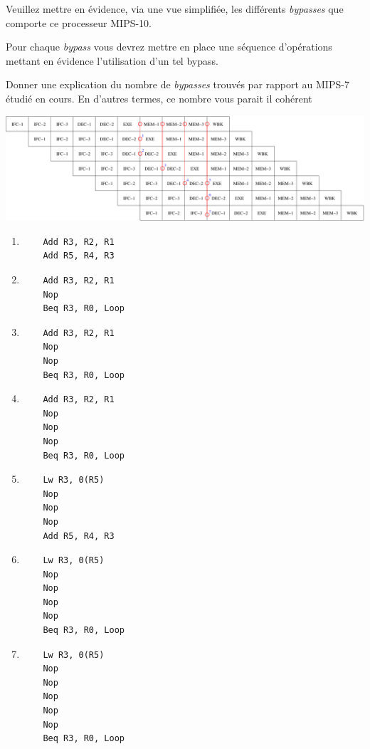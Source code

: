 Veuillez mettre en \'evidence, via une vue simplifi\'ee, les diff\'erents
\textit{bypasses} que comporte ce processeur MIPS-10.

Pour chaque \textit{bypass} vous devrez mettre en place une s\'equence
d'op\'erations mettant en \'evidence l'utilisation d'un tel bypass.

Donner une explication du nombre de \textit{bypasses} trouv\'es par rapport
au MIPS-7 \'etudi\'e en cours. En d'autres termes, ce nombre vous parait
il coh\'erent

\begin{correction}

  \begin{center}
    \includegraphics[scale=0.45]{figures/correction-bypasses.pdf}
  \end{center}

  \begin{enumerate}
    \item
      \begin{verbatim}
	Add R3, R2, R1
	Add R5, R4, R3
      \end{verbatim}
    \item
      \begin{verbatim}
	Add R3, R2, R1
	Nop
	Beq R3, R0, Loop
      \end{verbatim}
    \item
      \begin{verbatim}
	Add R3, R2, R1
	Nop
	Nop
	Beq R3, R0, Loop
      \end{verbatim}
    \item
      \begin{verbatim}
	Add R3, R2, R1
	Nop
	Nop
	Nop
	Beq R3, R0, Loop
      \end{verbatim}
    \item
      \begin{verbatim}
	Lw R3, 0(R5)
	Nop
	Nop
	Nop
	Add R5, R4, R3
      \end{verbatim}
    \item
      \begin{verbatim}
	Lw R3, 0(R5)
	Nop
	Nop
	Nop
	Nop
	Beq R3, R0, Loop
      \end{verbatim}
    \item
      \begin{verbatim}
	Lw R3, 0(R5)
	Nop
	Nop
	Nop
	Nop
	Nop
	Beq R3, R0, Loop
      \end{verbatim}
  \end{enumerate}

\end{correction}

